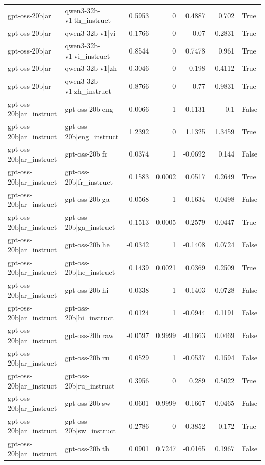 \begin{table}
\begin{tabular}{l l r r r r l}
gpt-oss-20b|ar & qwen3-32b-v1|th_instruct & 0.5953 & 0 & 0.4887 & 0.702 & True \\
gpt-oss-20b|ar & qwen3-32b-v1|vi & 0.1766 & 0 & 0.07 & 0.2831 & True \\
gpt-oss-20b|ar & qwen3-32b-v1|vi_instruct & 0.8544 & 0 & 0.7478 & 0.961 & True \\
gpt-oss-20b|ar & qwen3-32b-v1|zh & 0.3046 & 0 & 0.198 & 0.4112 & True \\
gpt-oss-20b|ar & qwen3-32b-v1|zh_instruct & 0.8766 & 0 & 0.77 & 0.9831 & True \\
gpt-oss-20b|ar_instruct & gpt-oss-20b|eng & -0.0066 & 1 & -0.1131 & 0.1 & False \\
gpt-oss-20b|ar_instruct & gpt-oss-20b|eng_instruct & 1.2392 & 0 & 1.1325 & 1.3459 & True \\
gpt-oss-20b|ar_instruct & gpt-oss-20b|fr & 0.0374 & 1 & -0.0692 & 0.144 & False \\
gpt-oss-20b|ar_instruct & gpt-oss-20b|fr_instruct & 0.1583 & 0.0002 & 0.0517 & 0.2649 & True \\
gpt-oss-20b|ar_instruct & gpt-oss-20b|ga & -0.0568 & 1 & -0.1634 & 0.0498 & False \\
gpt-oss-20b|ar_instruct & gpt-oss-20b|ga_instruct & -0.1513 & 0.0005 & -0.2579 & -0.0447 & True \\
gpt-oss-20b|ar_instruct & gpt-oss-20b|he & -0.0342 & 1 & -0.1408 & 0.0724 & False \\
gpt-oss-20b|ar_instruct & gpt-oss-20b|he_instruct & 0.1439 & 0.0021 & 0.0369 & 0.2509 & True \\
gpt-oss-20b|ar_instruct & gpt-oss-20b|hi & -0.0338 & 1 & -0.1403 & 0.0728 & False \\
gpt-oss-20b|ar_instruct & gpt-oss-20b|hi_instruct & 0.0124 & 1 & -0.0944 & 0.1191 & False \\
gpt-oss-20b|ar_instruct & gpt-oss-20b|raw & -0.0597 & 0.9999 & -0.1663 & 0.0469 & False \\
gpt-oss-20b|ar_instruct & gpt-oss-20b|ru & 0.0529 & 1 & -0.0537 & 0.1594 & False \\
gpt-oss-20b|ar_instruct & gpt-oss-20b|ru_instruct & 0.3956 & 0 & 0.289 & 0.5022 & True \\
gpt-oss-20b|ar_instruct & gpt-oss-20b|sw & -0.0601 & 0.9999 & -0.1667 & 0.0465 & False \\
gpt-oss-20b|ar_instruct & gpt-oss-20b|sw_instruct & -0.2786 & 0 & -0.3852 & -0.172 & True \\
gpt-oss-20b|ar_instruct & gpt-oss-20b|th & 0.0901 & 0.7247 & -0.0165 & 0.1967 & False \\

\end{tabular}
\end{table}
